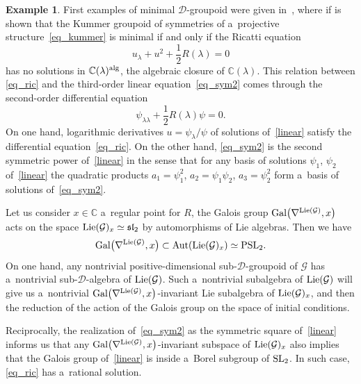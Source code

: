 \documentclass[10pt,a4paper]{amsart}
\numberwithin{equation}{section}
\theoremstyle{definition}
\newtheorem{Example}[Theorem]{Example}
\begin{document}
\begin{Example} First examples of minimal $\mathcal D$-groupoid were given in~\cite[Proposition 3.6]{Casale_BlazquezSanz_ArenasTirado_2025}, where if is shown that the Kummer groupoid of symmetries of a~projective structure~\eqref{eq_kummer} is minimal if and only if the Ricatti equation
\begin{equation}\label{eq_ric}
u_\lambda + u^2 + \frac{1}{2}R(\lambda)=0
\end{equation}
has no solutions in $\mathbb C(\lambda)^{\rm alg}$, the algebraic closure of $\mathbb C(\lambda)$. This relation between \eqref{eq_ric} and the third-order linear equation~\eqref{eq_sym2} comes through the
second-order differential equation
\begin{equation}\label{linear}
\psi_{\lambda\lambda} + \frac{1}{2}R(\lambda)\psi = 0.
\end{equation}
On one hand, logarithmic derivatives $u = \psi_\lambda/\psi$ of solutions of~\eqref{linear} satisfy the differential equation~\eqref{eq_ric}. On the other hand, \eqref{eq_sym2} is the second symmetric power of~\eqref{linear} in the sense that for any basis of solutions $\psi_1$, $\psi_2$ of~\eqref{linear} the quadratic products
$
a_1 = \psi_1^2$, $ a_2 = \psi_1\psi_2$, $ a_3 = \psi_2^2$
form a~basis of solutions of~\eqref{eq_sym2}.

Let us consider $x\in \mathbb C$ a~regular point for $R$,
the Galois group ${\rm Gal}\bigl(\nabla^{{\rm Lie}(\mathcal G)}, x\bigr)$ acts on the space ${\rm Lie}(\mathcal G)_{x}\simeq \mathfrak{sl}_2$ by automorphisms of Lie algebras. Then we have
\[
{\rm Gal}\bigl(\nabla^{{\rm Lie}(\mathcal G)}, x\bigr) \subset \operatorname{Aut}({\rm Lie}(\mathcal G)_{x}) \simeq {\rm PSL}_2.\]
On one hand, any nontrivial positive-dimensional sub-$\mathcal D$-groupoid of $\mathcal G$ has a~nontrivial sub-$\mathcal D$-algebra of ${\rm Lie}(\mathcal G)$. Such a~nontrivial subalgebra of ${\rm Lie}(\mathcal G)$ will give us a~nontrivial ${\rm Gal}\bigl(\nabla^{{\rm Lie}(\mathcal G)}, x\bigr)$-invariant Lie subalgebra of ${\rm Lie}(\mathcal G)_{x}$, and then the reduction of the action of the Galois group on the space of initial conditions.

Reciprocally, the realization of~\eqref{eq_sym2} as the symmetric square of~\eqref{linear} informs us that any ${\rm Gal}\bigl(\nabla^{{\rm Lie}(\mathcal G)}, x\bigr)$-invariant subspace of ${\rm Lie}(\mathcal G)_x$ also implies that the Galois group of~\eqref{linear} is inside a~Borel subgroup of ${\rm SL}_2$. In such case, \eqref{eq_ric} has a~rational solution.


\end{Example}
\end{document}
